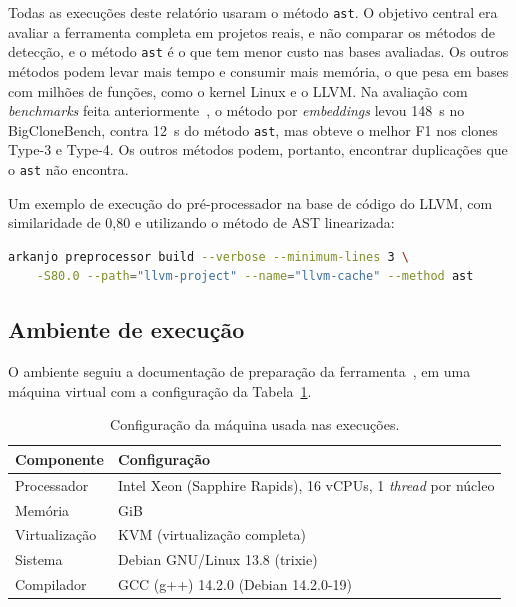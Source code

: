 \documentclass{article}
\begin{document}
Todas as execuções deste relatório usaram o método \texttt{ast}. O objetivo central era avaliar a ferramenta completa em projetos reais, e não comparar os métodos de detecção, e o método \texttt{ast} é o que tem menor custo nas bases avaliadas. Os outros métodos podem levar mais tempo e consumir mais memória, o que pesa em bases com milhões de funções, como o kernel Linux e o \textsc{LLVM}. Na avaliação com \emph{benchmarks} feita anteriormente~\cite{bozi2026mac0215}, o método por \emph{embeddings} levou 148~s no BigCloneBench, contra 12~s do método \texttt{ast}, mas obteve o melhor F1 nos clones Type-3 e Type-4. Os outros métodos podem, portanto, encontrar duplicações que o \texttt{ast} não encontra.

Um exemplo de execução do pré-processador na base de código do \textsc{LLVM}, com similaridade de 0,80 e utilizando o método de AST linearizada:

\begin{lstlisting}[style=macrocode,numbers=none,language=bash,morekeywords={arkanjo}]
arkanjo preprocessor build --verbose --minimum-lines 3 \
    -S80.0 --path="llvm-project" --name="llvm-cache" --method ast
\end{lstlisting}

\subsection{Ambiente de execução}

O ambiente seguiu a documentação de preparação da ferramenta~\cite{arkanjomethod}, em uma máquina virtual com a configuração da Tabela~\ref{tab:ambiente}.
\begin{table}[ht!]
\centering
\caption{Configuração da máquina usada nas execuções.}
\label{tab:ambiente}
\begin{tabularx}{1.0\textwidth}{l >{\raggedright\arraybackslash}X}
\toprule
Componente & Configuração \\
\midrule
Processador     & Intel Xeon (Sapphire Rapids), 16 vCPUs, 1 \emph{thread} por núcleo \\
Memória         & 62 GiB \\
Virtualização   & KVM (virtualização completa) \\
Sistema         & Debian GNU/Linux 13.8 (trixie) \\
Compilador      & GCC (g++) 14.2.0 (Debian 14.2.0-19) \\
\bottomrule
\end{tabularx}
\end{table}
\end{document}
